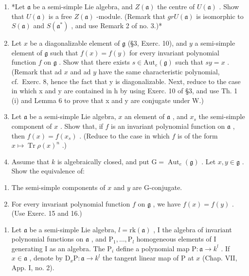 \begin{enumerate}
\def\labelenumi{\arabic{enumi})}
\setcounter{enumi}{13}
\item
  *Let \(\mathfrak{a}\) be a semi-simple Lie algebra, and \(Z(\mathfrak{a})\) the centre of \(U(\mathfrak{a})\) . Show that \(U(\mathfrak{a})\) is a free \(Z(\mathfrak{a})\) -module. (Remark that \(grU(\mathfrak{a})\) is isomorphic to \(S(\mathfrak{a})\) and \(S(\mathfrak{a}^*)\) , and use Remark 2 of no. 3.)*
\item
  Let \(x\) be a diagonalizable element of \(\mathfrak{g}\) (§3, Exerc. 10), and \(y\) a semi-simple element of \(\mathfrak{g}\) such that \(f(x) = f(y)\) for every invariant polynomial function \(f\) on \(\mathfrak{g}\) . Show that there exists \(s \in \mathrm{Aut}_e(\mathfrak{g})\) such that \(sy = x\) . (Remark that ad \(x\) and ad \(y\) have the same characteristic polynomial, cf.~Exerc. 8, hence the fact that y is diagonalizable. Next, reduce to the case in which x and y are contained in h by using Exerc. 10 of §3, and use Th. 1 (i) and Lemma 6 to prove that x and y are conjugate under W.)
\item
  Let \(\mathfrak{a}\) be a semi-simple Lie algebra, \(x\) an element of \(\mathfrak{a}\) , and \(x_{s}\) the semi-simple component of \(x\) . Show that, if \(f\) is an invariant polynomial function on \(\mathfrak{a}\) , then \(f(x) = f(x_{s})\) . (Reduce to the case in which \(f\) is of the form \(x \mapsto \operatorname{Tr} \rho(x)^n\) .)
\item
  Assume that \(k\) is algebraically closed, and put \(\mathrm{G} = \operatorname{Aut}_e(\mathfrak{g})\) . Let \(x, y \in \mathfrak{g}\) . Show the equivalence of:
\end{enumerate}

\begin{enumerate}
\def\labelenumi{(\roman{enumi})}
\item
  The semi-simple components of \(x\) and \(y\) are G-conjugate.
\item
  For every invariant polynomial function \(f\) on \(\mathfrak{g}\) , we have \(f(x) = f(y)\) . (Use Exerc. 15 and 16.)
\end{enumerate}

\begin{enumerate}
\def\labelenumi{\arabic{enumi})}
\setcounter{enumi}{17}
\tightlist
\item
  Let \(\mathfrak{a}\) be a semi-simple Lie algebra, \(l = \mathrm{rk}(\mathfrak{a})\) , I the algebra of invariant polynomial functions on \(\mathfrak{a}\) , and \(\mathrm{P}_1, \ldots, \mathrm{P}_l\) homogeneous elements of I generating I as an algebra. The \(\mathrm{P}_i\) define a polynomial map \(\mathrm{P} : \mathfrak{a} \to k^l\) . If \(x \in \mathfrak{a}\) , denote by \(\mathrm{D}_x\mathrm{P} : \mathfrak{a} \to k^l\) the tangent linear map of P at \(x\) (Chap. VII, App. I, no. 2).
\end{enumerate}

